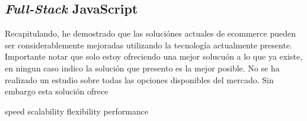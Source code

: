 	\subsection{ \textit{Full-Stack} JavaScript }
	



Recapitulando, he demostrado que las soluciónes actuales de ecommerce pueden ser considerablemente mejoradas utilizando la tecnología actualmente presente. 
Importante notar que solo estoy ofreciendo una mejor solucuón a lo que ya existe, en ningun caso indico la solución que presento es la mejor posible. No se ha realizado un estudio sobre todas las opciones disponibles del mercado. Sin embargo esta solución ofrece

speed
scalability
flexibility
performance
